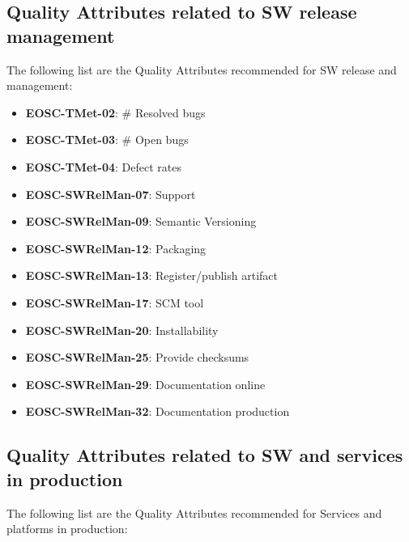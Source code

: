 \subsection{Quality Attributes related to SW release management}

The following list are the Quality Attributes recommended for SW release and management:

\begin{itemize}
    \item \textbf{EOSC-TMet-02}: \# Resolved bugs
    \item \textbf{EOSC-TMet-03}: \# Open bugs
    \item \textbf{EOSC-TMet-04}: Defect rates
    \item \textbf{EOSC-SWRelMan-07}: Support
    \item \textbf{EOSC-SWRelMan-09}: Semantic Versioning
    \item \textbf{EOSC-SWRelMan-12}: Packaging
    \item \textbf{EOSC-SWRelMan-13}: Register/publish artifact
    \item \textbf{EOSC-SWRelMan-17}: SCM tool
    \item \textbf{EOSC-SWRelMan-20}: Installability
    \item \textbf{EOSC-SWRelMan-25}: Provide checksums
    \item \textbf{EOSC-SWRelMan-29}: Documentation online
    \item \textbf{EOSC-SWRelMan-32}: Documentation production
\end{itemize}

\subsection{Quality Attributes related to SW and services in production}

The following list are the Quality Attributes recommended for Services and platforms in production:

